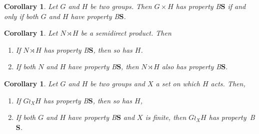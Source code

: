 \documentclass[a4paper]{article}
\newtheorem{cor}[lem]{Corollary}
\theoremstyle{definition}
\newcommand*{\BS}{B$\mathbf{S}$}
\begin{document}
%
%
%
%
\begin{cor}\label{Cor:Prod}
Let $G$ and $H$ be two groups. Then $G\times H$ has property \BS{} if and only if both $G$ and $H$ have property \BS.
\end{cor}
%
%
\begin{cor}\label{Cor:Semidirect}
Let $N\rtimes H$ be a semidirect product. Then
\begin{enumerate}
\item
If $N\rtimes H$ has property \BS, then so has $H$.
\item
If both $N$ and $H$ have property \BS, then $N\rtimes H$ also has property \BS.
\end{enumerate}
\end{cor}
%
\begin{cor}\label{Cor:Wreath}
Let $G$ and $H$ be two groups and $X$ a set on which $H$ acts. Then,
\begin{enumerate}
\item
If $G\wr_X H$ has property \BS, then so has $H$,
\item
If both $G$ and $H$ have property \BS{} and $X$ is finite, then $G\wr_X H$ has property~\BS.
\end{enumerate}
\end{cor}
\end{document}
